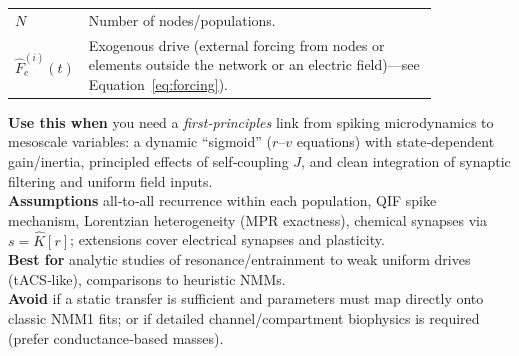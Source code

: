\documentclass[12pt]{article}
\numberwithin{equation}{section}
\begin{document}
\begin{tcolorbox}
\begin{tabular}{@{}l p{0.84\linewidth}@{}}
\textbf{$N$} & Number of nodes/populations.\\
\textbf{$\hat F_{e}^{(i)}(t)$}& Exogenous drive  (external forcing from nodes or elements outside the network or an electric field)---see Equation~\ref{eq:forcing}).\\
\end{tabular}
\end{tcolorbox}

\begin{tcolorbox}[
  colback=gray!5,
  colframe=slate,
  colbacktitle=softblue!25,
  coltitle=softblue!60!black,
  fonttitle=\bfseries\small,
  title={\small When to Use It — Next‑Generation Neural Mass (NMM2)},
  boxrule=0.4pt, enhanced, sharp corners,
  left=4pt,right=4pt,top=3pt,bottom=3pt,
  boxsep=2pt, before skip=6pt, after skip=6pt
]
\scriptsize
\textbf{Use this when} you need a \emph{first‑principles} link from spiking microdynamics to mesoscale variables: a dynamic “sigmoid” ($r$–$v$ equations) with state‑dependent gain/inertia, principled effects of self‑coupling $J$, and clean integration of synaptic filtering and uniform field inputs.\\
\textbf{Assumptions} all‑to‑all recurrence within each population, QIF spike mechanism, Lorentzian heterogeneity (MPR exactness), chemical synapses via $s=\hat K[r]$; extensions cover electrical synapses and plasticity.\\
\textbf{Best for} analytic studies of resonance/entrainment to weak uniform drives (tACS‑like), comparisons to heuristic NMMs.\\
\textbf{Avoid} if a static transfer is sufficient and parameters must map directly onto classic NMM1 fits; or if detailed channel/compartment biophysics is required (prefer conductance‑based masses).
\end{tcolorbox}
\end{document}
